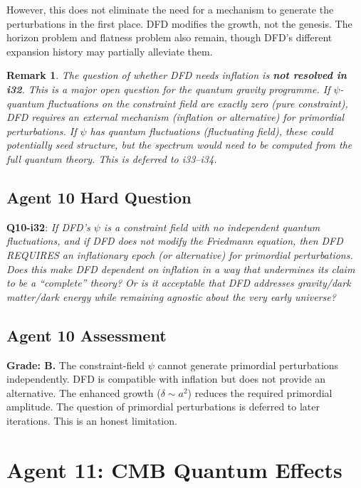 \documentclass[11pt,a4paper]{article}
\newtheorem{remark}{Remark}
\begin{document}
However, this does not eliminate the need for a mechanism to generate the perturbations in the first place. DFD modifies the growth, not the genesis. The horizon problem and flatness problem also remain, though DFD's different expansion history may partially alleviate them.

\begin{remark}
The question of whether DFD needs inflation is \textbf{not resolved in i32}. This is a major open question for the quantum gravity programme. If $\psi$-quantum fluctuations on the constraint field are exactly zero (pure constraint), DFD \emph{requires} an external mechanism (inflation or alternative) for primordial perturbations. If $\psi$ has quantum fluctuations (fluctuating field), these could potentially seed structure, but the spectrum would need to be computed from the full quantum theory. This is deferred to i33--i34.
\end{remark}

\subsection{Agent 10 Hard Question}

\textbf{Q10-i32}: \emph{If DFD's $\psi$ is a constraint field with no independent quantum fluctuations, and if DFD does not modify the Friedmann equation, then DFD REQUIRES an inflationary epoch (or alternative) for primordial perturbations. Does this make DFD dependent on inflation in a way that undermines its claim to be a ``complete'' theory? Or is it acceptable that DFD addresses gravity/dark matter/dark energy while remaining agnostic about the very early universe?}

\subsection{Agent 10 Assessment}

\textbf{Grade: B.} The constraint-field $\psi$ cannot generate primordial perturbations independently. DFD is compatible with inflation but does not provide an alternative. The enhanced growth ($\delta \sim a^2$) reduces the required primordial amplitude. The question of primordial perturbations is deferred to later iterations. This is an honest limitation.


\newpage
\section{Agent 11: CMB Quantum Effects}
\label{sec:agent11}
\end{document}
